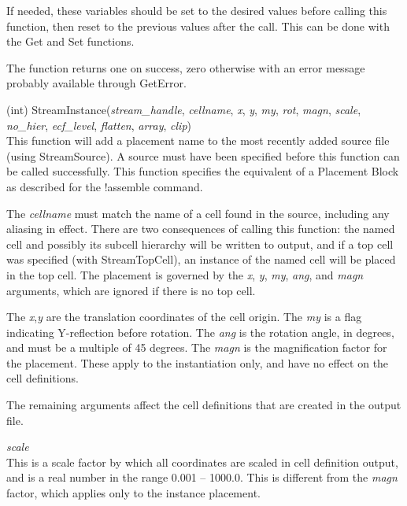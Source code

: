 \begin{description}
\begin{description}
If needed, these variables should be set to the desired values before
calling this function, then reset to the previous values after the
call.  This can be done with the {\vt Get} and {\vt Set} functions.
\end{description}

The function returns one on success, zero otherwise with an error
message probably available through {\vt GetError}.

\item{(int) \vt StreamInstance({\it stream\_handle}, {\it cellname\/},
  {\it x\/}, {\it y\/}, {\it my\/}, {\it rot\/}, {\it magn\/},
  {\it scale\/}, {\it no\_hier\/},\newline
  {\it ecf\_level\/}, {\it flatten\/}, {\it array\/}, {\it clip\/})}\\
This function will add a placement name to the most recently added
source file (using {\vt StreamSource}).  A source must have been
specified before this function can be called successfully.  This
function specifies the equivalent of a Placement Block as described
for the {\cb !assemble} command.

The {\it cellname} must match the name of a cell found in the source,
including any aliasing in effect.  There are two consequences of
calling this function:  the named cell and possibly its subcell
hierarchy will be written to output, and if a top cell was specified
(with {\vt StreamTopCell}), an instance of the named cell will be
placed in the top cell.  The placement is governed by the {\it x\/},
{\it y\/}, {\it my\/}, {\it ang\/}, and {\it magn\/} arguments, which
are ignored if there is no top cell.

The {\it x\/},{\it y} are the translation coordinates of the cell
origin.  The {\it my} is a flag indicating Y-reflection before
rotation.  The {\it ang} is the rotation angle, in degrees, and must
be a multiple of 45 degrees.  The {\it magn} is the magnification
factor for the placement.  These apply to the instantiation only, and
have no effect on the cell definitions.

The remaining arguments affect the cell definitions that are created
in the output file.

\begin{description}
\item{\it scale}\\
This is a scale factor by which all coordinates are scaled in cell
definition output, and is a real number in the range 0.001 -- 1000.0. 
This is different from the {\it magn} factor, which applies only to
the instance placement.


\end{description}
\end{description}
